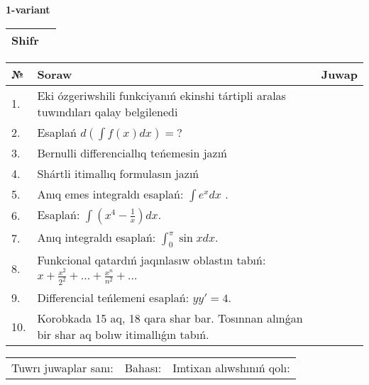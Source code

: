 \documentclass{article}
\begin{document}


  \textbf{1-variant}\\
  
  \bgroup
  \def\arraystretch{1.6} %
  
  \begin{tabular}{|m{5.7cm}|m{9.5cm}|}
  \hline
  Shifr & \\
  \hline
  \end{tabular}
  
  \vspace{1cm}
  
  \begin{tabular}{|m{0.7cm}|m{10cm}|m{4cm}|}
  \hline
  № & Soraw & Juwap \\
  \hline
  1. & Eki ózgeriwshili funkciyanıń ekinshi tártipli aralas tuwındıları qalay belgilenedi &  \\
  \hline
  2. & Esaplań \(d\left( \int{f(x)dx} \right) = ?\) &  \\
  \hline
  3. & Bernulli differenciallıq teńemesin jazıń &  \\
  \hline
  4. & Shártli itimallıq formulasın jazıń &  \\
  \hline
  5. & Anıq emes integraldı esaplań: \(\int{e^{x}dx}\) . &  \\
  \hline
  6. & Esaplań: \(\int\left( x^{4} - \frac{1}{x} \right)dx\). &  \\
  \hline
  7. & Anıq integraldı esaplań: \(\int_{0}^{\pi}{\sin xdx}\). &  \\
  \hline
  8. & Funkcional qatardıń jaqınlasıw oblastın tabıń: \(x + \frac{x^2 }{2^2 } + ... + \frac{x^{n}}{n^2 } + ...\) &  \\
  \hline
  9. & Differencial teńlemeni esaplań: \(yy' = 4\). &  \\
  \hline
  10. & Korobkada 15 aq, 18 qara shar bar. Tosınnan alınǵan bir shar aq bolıw itimallıǵın tabıń. &  \\
  \hline
  \end{tabular}
  
  \vspace{1cm}
  
  \begin{tabular}{lll}
  Tuwrı juwaplar sanı: \underline{\hspace{1.5cm}} & 
  Bahası: \underline{\hspace{1.5cm}} & 
  Imtixan alıwshınıń qolı: \underline{\hspace{2cm}} \\
  \end{tabular}
  
\end{document}
